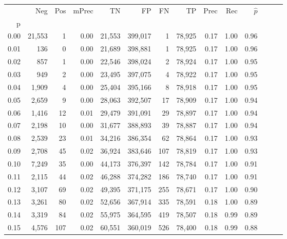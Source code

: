 \begin{tabular}{rrrrrrrrrrrrrr}
\toprule
{} &     Neg &    Pos & mPrec &       TN &       FP &      FN &      TP &  Prec &   Rec & $\hat{p}$ \\
p    &         &        &       &          &          &         &         &       &       &           \\
\midrule
0.00 &  21,553 &      1 &  0.00 &   21,553 &  399,017 &       1 &  78,925 &  0.17 &  1.00 &      0.96 \\
0.01 &     136 &      0 &  0.00 &   21,689 &  398,881 &       1 &  78,925 &  0.17 &  1.00 &      0.96 \\
0.02 &     857 &      1 &  0.00 &   22,546 &  398,024 &       2 &  78,924 &  0.17 &  1.00 &      0.95 \\
0.03 &     949 &      2 &  0.00 &   23,495 &  397,075 &       4 &  78,922 &  0.17 &  1.00 &      0.95 \\
0.04 &   1,909 &      4 &  0.00 &   25,404 &  395,166 &       8 &  78,918 &  0.17 &  1.00 &      0.95 \\
0.05 &   2,659 &      9 &  0.00 &   28,063 &  392,507 &      17 &  78,909 &  0.17 &  1.00 &      0.94 \\
0.06 &   1,416 &     12 &  0.01 &   29,479 &  391,091 &      29 &  78,897 &  0.17 &  1.00 &      0.94 \\
0.07 &   2,198 &     10 &  0.00 &   31,677 &  388,893 &      39 &  78,887 &  0.17 &  1.00 &      0.94 \\
0.08 &   2,539 &     23 &  0.01 &   34,216 &  386,354 &      62 &  78,864 &  0.17 &  1.00 &      0.93 \\
0.09 &   2,708 &     45 &  0.02 &   36,924 &  383,646 &     107 &  78,819 &  0.17 &  1.00 &      0.93 \\
0.10 &   7,249 &     35 &  0.00 &   44,173 &  376,397 &     142 &  78,784 &  0.17 &  1.00 &      0.91 \\
0.11 &   2,115 &     44 &  0.02 &   46,288 &  374,282 &     186 &  78,740 &  0.17 &  1.00 &      0.91 \\
0.12 &   3,107 &     69 &  0.02 &   49,395 &  371,175 &     255 &  78,671 &  0.17 &  1.00 &      0.90 \\
0.13 &   3,261 &     80 &  0.02 &   52,656 &  367,914 &     335 &  78,591 &  0.18 &  1.00 &      0.89 \\
0.14 &   3,319 &     84 &  0.02 &   55,975 &  364,595 &     419 &  78,507 &  0.18 &  0.99 &      0.89 \\
0.15 &   4,576 &    107 &  0.02 &   60,551 &  360,019 &     526 &  78,400 &  0.18 &  0.99 &      0.88 \\

\end{tabular}

